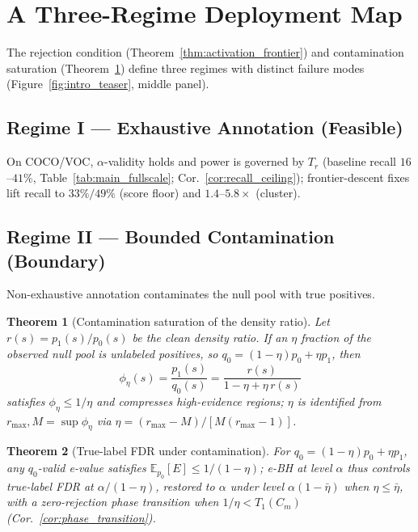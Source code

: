 \documentclass{article}
\newtheorem{theorem}{Theorem}
\theoremstyle{remark}
\newcommand{\1}{\mathbf{1}}
\begin{document}
\section{A Three-Regime Deployment Map}
\label{sec:boundary}

The rejection condition (Theorem~\ref{thm:activation_frontier}) and
contamination saturation (Theorem~\ref{thm:contamination}) define
three regimes with distinct failure modes
(Figure~\ref{fig:intro_teaser}, middle panel).

\subsection{Regime I --- Exhaustive Annotation (Feasible)}

On COCO/VOC, $\alpha$-validity holds and power is governed by $T_r$
(baseline recall $16$--$41\%$, Table~\ref{tab:main_fullscale};
Cor.~\ref{cor:recall_ceiling}); frontier-descent fixes lift recall to
$33\%/49\%$ (score floor) and $1.4$--$5.8\times$ (cluster).

\subsection{Regime II --- Bounded Contamination (Boundary)}

Non-exhaustive annotation contaminates the null pool with true positives.

\begin{theorem}[Contamination saturation of the density ratio]
\label{thm:contamination}
Let $r(s)=p_1(s)/p_0(s)$ be the clean density ratio. If an $\eta$ fraction
of the observed null pool is unlabeled positives, so
$q_0=(1-\eta)p_0+\eta p_1$, then
\begin{equation}
\phi_\eta(s)
= \frac{p_1(s)}{q_0(s)}
= \frac{r(s)}{1-\eta+\eta\,r(s)}
\label{eq:contaminated_phi}
\end{equation}
satisfies $\phi_\eta\le1/\eta$ and compresses high-evidence regions;
$\eta$ is identified from $r_{\max},M\!=\!\sup\phi_\eta$ via
$\eta=(r_{\max}-M)/[M(r_{\max}-1)]$.
\end{theorem}

\begin{theorem}[True-label FDR under contamination]
\label{thm:true_label_fdr}
For $q_0=(1-\eta)p_0+\eta p_1$, any $q_0$-valid e-value satisfies
$\mathbb{E}_{p_0}[E]\le1/(1-\eta)$; e-BH at level $\alpha$ thus
controls true-label FDR at $\alpha/(1-\eta)$, restored to $\alpha$
under level $\alpha(1-\bar\eta)$ when $\eta\le\bar\eta$, with a
zero-rejection phase transition when $1/\eta<T_1(C_m)$
(Cor.~\ref{cor:phase_transition}).
\end{theorem}
\end{document}
